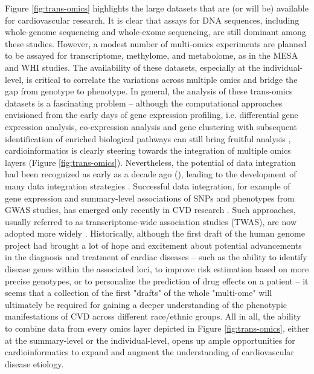\documentclass[letter]{bioinfo}
\begin{document}
	 Figure \ref{fig:trans-omics} highlights the large datasets that are (or will be) available for cardiovascular research. It is clear that assays for DNA sequences, including whole-genome sequencing and whole-exome sequencing, are still dominant among these studies. However, a modest number of multi-omics experiments are planned to be assayed for transcriptome, methylome, and metabolome, as in the MESA and WHI studies. The availability of these datasets, especially at the individual-level, is critical to correlate the variations across multiple omics and bridge the gap from genotype to phenotype.  In general, the analysis of these trans-omics datasets is a fascinating problem -- although the computational approaches envisioned from the early days of gene expression profiling, i.e. differential gene expression analysis, co-expression analysis and gene clustering with subsequent identification of enriched biological pathways \citep{Claverie:1999:Computational} can still bring fruitful analysis \citep{Santolini:2018:personalized}, cardioinformatics is clearly steering towards the integration of multiple omics layers (Figure \ref{fig:trans-omics}). Nevertheless, the potential of data integration had been recognized as early as a decade ago (\cite{Hawkins:2010:Nextgeneration}), leading to the development of many data integration strategies \citep{Ritchie:2015:Methods}. Successful data integration, for example of gene expression and summary-level associations of SNPs and phenotypes from GWAS studies, has emerged only recently in CVD research \citep{Gusev:2016:Integrative}. Such approaches, usually referred to as transcriptome-wide association studies (TWAS), are now adopted more widely \citep{Klarin:2018:Genetics}.  Historically, although the first draft of the human genome project had brought a lot of hope and excitement about potential advancements in the diagnosis and treatment of cardiac diseases -- such as the ability to identify disease genes within the associated loci, to improve risk estimation based on more precise genotypes, or to personalize the prediction of drug effects on a patient \citep{Komajda:2001:heart} -- it seems that a collection of the first "drafts" of the whole "multi-ome" will ultimately be required for gaining a deeper understanding of the phenotypic manifestations of CVD across different race/ethnic groups.  All in all, the ability to combine data from every omics layer depicted in Figure \ref{fig:trans-omics}, either at the summary-level or the individual-level, opens up ample opportunities for cardioinformatics to expand and augment the understanding of cardiovascular disease etiology.
	
\end{document}
